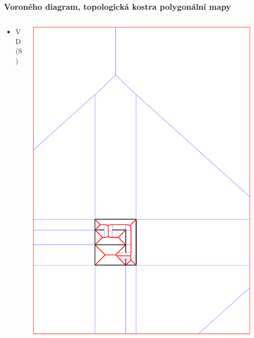 \documentclass[notes=false,pdftex]{beamer}
\begin{document}
\begin{frame}
	\frametitle{Voroného diagram, topologická kostra polygonální mapy}

	\begin{columns}[T]
		\begin{column}{0.5\textwidth}
			\begin{itemize}
				\item VD(S)
			\end{itemize}
		\end{column}
		\begin{column}{0.5\textwidth}
			\includegraphics[width=1\textwidth,clip=true,trim=147pt 165pt 289pt 502pt]{images/vd_03.pdf} 
		\end{column}
	\end{columns}
\end{frame}
\end{document}
